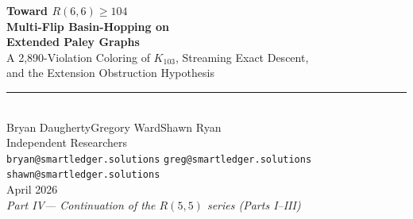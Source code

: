 \documentclass[11pt,a4paper]{article}
\theoremstyle{plain}
\theoremstyle{remark}
\begin{document}
\thispagestyle{empty}


\vspace*{0.5cm}

\begin{center}
  {\fontsize{22}{26}\selectfont\bfseries\color{accent}
   Toward $R(6,6) \geq 104$}\\[6pt]
  {\fontsize{16}{20}\selectfont\bfseries\color{accent}
   Multi-Flip Basin-Hopping on\\
   Extended Paley Graphs}\\[14pt]
  {\large\color{accentlight}
   A 2{,}890-Violation Coloring of $K_{103}$, Streaming Exact Descent,\\
   and the Extension Obstruction Hypothesis}\\[20pt]
  {\color{titlegold}\rule{6cm}{0.8pt}}\\[20pt]
  {\Large Bryan Daugherty\qquad Gregory Ward\qquad Shawn Ryan}\\[8pt]
  {\small\color{subtlegray}
    Independent Researchers\\[2pt]
    \texttt{bryan@smartledger.solutions}\quad
    \texttt{greg@smartledger.solutions}\quad
    \texttt{shawn@smartledger.solutions}}\\[16pt]
  {\normalsize\color{subtlegray} April 2026}\\[6pt]
  {\small\color{subtlegray}\itshape Part IV\enspace---\enspace
    Continuation of the $R(5,5)$ series (Parts I--III)}
\end{center}

\vspace{14pt}

\noindent
{}

\vspace{10pt}
\end{document}
